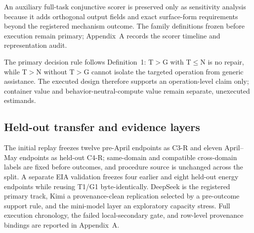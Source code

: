 An auxiliary full-task conjunctive scorer is preserved only as sensitivity analysis because it adds orthogonal output fields and exact surface-form requirements beyond the registered mechanism outcome. The family definitions frozen before execution remain primary; Appendix~A records the scorer timeline and representation audit.

The primary decision rule follows Definition~1: T$>$G with T$\leq$N is no repair, while T$>$N without T$>$G cannot isolate the targeted operation from generic assistance. The executed design therefore supports an operation-level claim only; container value and behavior-neutral-compute value remain separate, unexecuted estimands.

\subsection{Held-out transfer and evidence layers}
The initial replay freezes twelve pre-April endpoints as C3-R and eleven April--May endpoints as held-out C4-R; same-domain and compatible cross-domain labels are fixed before outcomes, and procedure source is unchanged across the split. A separate EIA validation freezes four earlier and eight held-out energy endpoints while reusing T1/G1 byte-identically. DeepSeek is the registered primary track, Kimi a provenance-clean replication selected by a pre-outcome support rule, and the mini-model layer an exploratory capacity stress. Full execution chronology, the failed local-secondary gate, and row-level provenance bindings are reported in Appendix~A.
